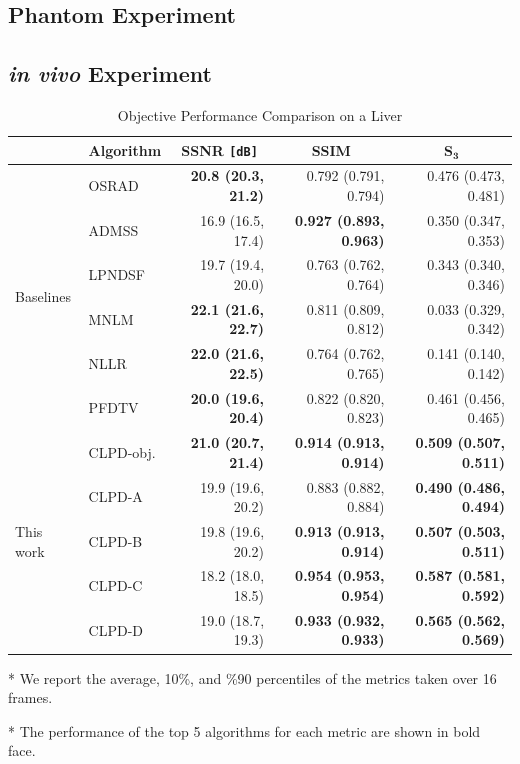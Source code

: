 \subsection{Phantom Experiment}
\subsection{\textit{in vivo} Experiment}

\begin{table}
  \centering
  \caption{Objective Performance Comparison on a Liver}
  \begin{threeparttable}
  \begin{tabular}{llrrr}
    \toprule
    & \multicolumn{1}{c}{\textbf{Algorithm}}
    & \multicolumn{1}{c}{\textbf{SSNR} \texttt{[dB]}}
    & \multicolumn{1}{c}{\textbf{SSIM}}
    & \multicolumn{1}{c}{\(\mathbf{S_{3}}\)} \\\midrule
    \multirow{6}{*}{Baselines} & OSRAD & \textbf{20.8 (20.3, 21.2)} & 0.792 (0.791, 0.794) & 0.476 (0.473, 0.481)\\
    & ADMSS & 16.9 (16.5, 17.4) & \textbf{0.927 (0.893, 0.963)} & 0.350 (0.347, 0.353) \\
    & LPNDSF & 19.7 (19.4, 20.0) & 0.763 (0.762, 0.764)         & 0.343 (0.340, 0.346) \\
    & MNLM & \textbf{22.1 (21.6, 22.7)} & 0.811 (0.809, 0.812)  & 0.033 (0.329, 0.342) \\
    & NLLR & \textbf{22.0 (21.6, 22.5)} & 0.764 (0.762, 0.765)  & 0.141 (0.140, 0.142) \\
    & PFDTV & \textbf{20.0 (19.6, 20.4)} & 0.822 (0.820, 0.823) & 0.461 (0.456, 0.465) \\
    \midrule
    \multirow{5}{*}{This work} & CLPD-obj.  & \textbf{21.0 (20.7, 21.4)} & \textbf{0.914 (0.913, 0.914)} & \textbf{0.509 (0.507, 0.511)} \\
    & CLPD-A  & 19.9 (19.6, 20.2) & 0.883 (0.882, 0.884) & \textbf{0.490 (0.486, 0.494)} \\
    & CLPD-B  & 19.8 (19.6, 20.2) & \textbf{0.913 (0.913, 0.914)} & \textbf{0.507 (0.503, 0.511)} \\
    & CLPD-C  & 18.2 (18.0, 18.5) & \textbf{0.954 (0.953, 0.954)} & \textbf{0.587 (0.581, 0.592)} \\
    & CLPD-D & 19.0 (18.7, 19.3) & \textbf{0.933 (0.932, 0.933)} &  \textbf{0.565 (0.562, 0.569)} \\\bottomrule
  \end{tabular}
  \begin{tablenotes}
    \item[*] We report the average, 10\%, and \%90 percentiles of the metrics taken over 16 frames.
    \item[*] The performance of the top 5 algorithms for each metric are shown in bold face.
  \end{tablenotes}
  \end{threeparttable}
\end{table}

